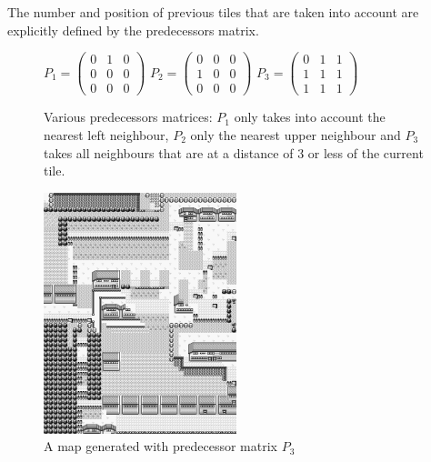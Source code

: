 \documentclass[A4paper,]{article}
\begin{document}
The number and position of previous tiles that are taken into account
are explicitly defined by the predecessors matrix.

\begin{figure}[h]
\centering
$
P_1=
\begin{pmatrix}
 0& 1& 0\\ 
 0& 0& 0\\ 
 0& 0& 0 
\end{pmatrix}
$
$
P_2= 
\begin{pmatrix}
 0& 0& 0\\ 
 1& 0& 0\\ 
 0& 0& 0 
\end{pmatrix}
$
$
P_3=
\begin{pmatrix}
 0& 1& 1\\ 
 1& 1& 1\\ 
 1& 1& 1 
\end{pmatrix}
$
\caption{Various predecessors matrices: $P_1$ only takes into account the
nearest left neighbour, $P_2$ only the nearest upper neighbour and $P_3$ takes
all neighbours that are at a distance of 3 or less of the current tile.}
\end{figure}

\begin{figure}
\centering
\includegraphics[width=0.50000\textwidth]{../data/pokemon-red/generated/250n-3k/image/36.png}
\caption{A map generated with predecessor matrix
\(P_3\)}\label{fig:3k-map}
\end{figure}
\end{document}

